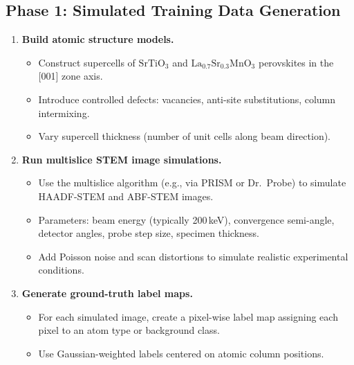 \documentclass[11pt,a4paper]{article}
\begin{document}
\subsection{Phase 1: Simulated Training Data Generation}
\begin{enumerate}[label=\textbf{1.\arabic*}]
  \item \textbf{Build atomic structure models.}
    \begin{itemize}
      \item Construct supercells of $\mathrm{SrTiO_3}$ and $\mathrm{La_{0.7}Sr_{0.3}MnO_3}$ perovskites in the [001] zone axis.
      \item Introduce controlled defects: vacancies, anti-site substitutions, column intermixing.
      \item Vary supercell thickness (number of unit cells along beam direction).
    \end{itemize}
  \item \textbf{Run multislice STEM image simulations.}
    \begin{itemize}
      \item Use the multislice algorithm (e.g., via PRISM or Dr.\ Probe) to simulate HAADF-STEM and ABF-STEM images.
      \item Parameters: beam energy (typically 200\,keV), convergence semi-angle, detector angles, probe step size, specimen thickness.
      \item Add Poisson noise and scan distortions to simulate realistic experimental conditions.
    \end{itemize}
  \item \textbf{Generate ground-truth label maps.}
    \begin{itemize}
      \item For each simulated image, create a pixel-wise label map assigning each pixel to an atom type or background class.
      \item Use Gaussian-weighted labels centered on atomic column positions.
    \end{itemize}
\end{enumerate}
\end{document}
